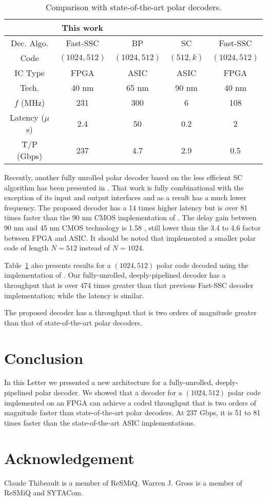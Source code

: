 \documentclass[letterpaper,onecolumn,journal,12pt]{IEEEtran}
\begin{document}
\begin{table}[h]
  \centering
  \caption{Comparison with state-of-the-art polar decoders.}
  \begin{tabular}{c c c c c}
    \toprule
                 & This work & \cite{Park2014} & \cite{Dizdar2014} & \cite{Sarkis2014}\\
    \midrule
    Dec. Algo.   & Fast-SSC  & BP              & SC                & Fast-SSC\\
    Code         & $(1024,512)$ & $(1024,512)$ & $(512,k)$         & $(1024,512)$\\
    IC Type      & FPGA      & ASIC            & ASIC              & FPGA\\
    Tech.        & 40 nm     & 65 nm           & 90 nm             & 40 nm\\
    $f$ (MHz)    & 231       & 300             & 6                 & 108\\
    Latency ($\mu$s) & 2.4   & 50              & 0.2               & 2\\
    T/P (Gbps)   & 237       & 4.7             & 2.9               & 0.5\\
    \bottomrule
  \end{tabular}
  \label{tab:cmp_results}
\end{table}

Recently, another fully unrolled polar decoder based on the less efficient SC algorithm has been presented in \cite{Dizdar2014}. That work is fully combinational with the exception of its input and output interfaces and as a result has a much lower frequency. The proposed decoder has a 14 times higher latency but is over 81 times faster than the 90 nm CMOS implementation of \cite{Dizdar2014}. The delay gain between 90 nm and 45 nm CMOS technology is 1.58 \cite{Wong2011}, still lower than the 3.4 to 4.6 factor between FPGA and ASIC. It should be noted that \cite{Dizdar2014} implemented a smaller polar code of length $N = 512$ instead of $N=1024$.

Table~\ref{tab:cmp_results} also presents results for a $(1024,512)$ polar code decoded using the implementation of \cite{Sarkis2014}. Our fully-unrolled, deeply-pipelined decoder has a throughput that is over 474 times greater than that previous Fast-SSC decoder implementation; while the latency is similar.

The proposed decoder has a throughput that is two orders of magnitude greater than that of state-of-the-art polar decoders.

\section{Conclusion}
In this Letter we presented a new architecture for a fully-unrolled,
deeply-pipelined polar decoder. We showed that a decoder for a $(1024,512)$
polar code implemented on an FPGA can achieve a coded throughput that is two
orders of magnitude faster than state-of-the-art polar decoders. At 237 Gbps, it is 51 to 81 times faster than the state-of-the-art ASIC implementations.

\section*{Acknowledgement}
Claude Thibeault is a member of ReSMiQ. Warren J. Gross is a member of ReSMiQ and SYTACom.



\end{document}
